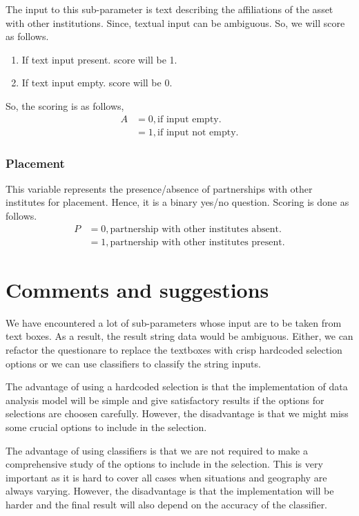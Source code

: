 \documentclass[oneside,twocolumn]{article}
\begin{document}
The input to this sub-parameter is text describing the affiliations
of the asset with other institutions. Since, textual input
can be ambiguous. So, we will score as follows.
\begin{enumerate}
\item If text input present. score will be 1.
\item If text input empty. score will be 0.
\end{enumerate}

So, the scoring is as follows,
\begin{align*}
	A &= 0, \text{if input empty.} \\
	  &= 1, \text{if input not empty.}
\end{align*}

\subsubsection{Placement}
This variable represents the presence/absence of partnerships
with other institutes for placement. Hence, it is a binary
yes/no question. Scoring is done as follows.
\begin{align*}
	P &= 0, \text{partnership with other institutes absent.} \\
	  &= 1, \text{partnership with other institutes present.}
\end{align*}

\section{Comments and suggestions}
We have encountered a lot of sub-parameters whose input are to
be taken from text boxes. As a result, the result string data
would be ambiguous. Either, we can refactor the questionare to
replace the textboxes with crisp hardcoded selection options
or we can use classifiers to classify the string inputs.

The advantage of using a hardcoded selection is that the
implementation of data analysis model will be simple and give
satisfactory results if the options for selections are choosen
carefully. However, the disadvantage is that we might miss some
crucial options to include in the selection.

The advantage of using classifiers is that we are not required
to make a comprehensive study of the options to include in the
selection. This is very important as it is hard to cover all
cases when situations and geography are always varying. However,
the disadvantage is that the implementation will be harder and
the final result will also depend on the accuracy of the
classifier.
\end{document}
